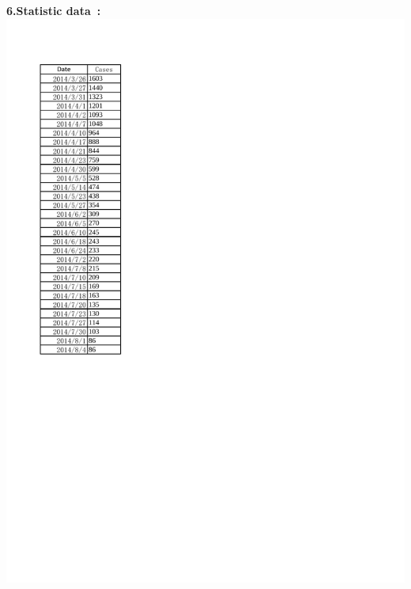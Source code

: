 %
\textbf{6.Statistic data\textnormal{~\cite{bib5}}:}\\
\includegraphics{imgs/statistic.pdf}\nline%
%

